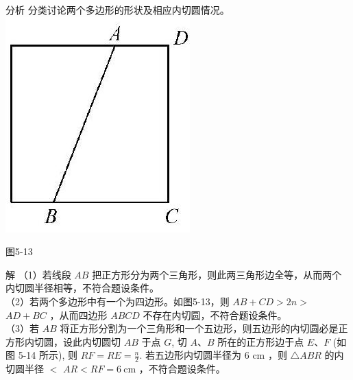 \documentclass[10pt]{article}
\begin{document}
分析 分类讨论两个多边形的形状及相应内切圆情况。\\
\includegraphics[max width=\textwidth, center]{2024_10_30_66b8e5e701da2093c133g-038(1)}

图5-13

解 （1）若线段 $A B$ 把正方形分为两个三角形，则此两三角形边全等，从而两个内切圆半径相等，不符合题设条件。\\
（2）若两个多边形中有一个为四边形。如图5-13，则 $A B+C D>2 n>$ $A D+B C$ ，从而四边形 $A B C D$ 不存在内切圆，不符合题设条件。\\
（3）若 $A B$ 将正方形分割为一个三角形和一个五边形，则五边形的内切圆必是正方形内切圆，设此内切圆切 $A B$ 于点 $G$, 切 $A 、 B$ 所在的正方形边于点 $E 、 F$ (如图 5-14 所示), 则 $R F=R E=\frac{n}{2}$. 若五边形内切圆半径为 6 cm ，则 $\triangle A B R$ 的内切圆半径 $<$ $A R<R F=6 \mathrm{~cm}$ ，不符合题设条件。
\end{document}
